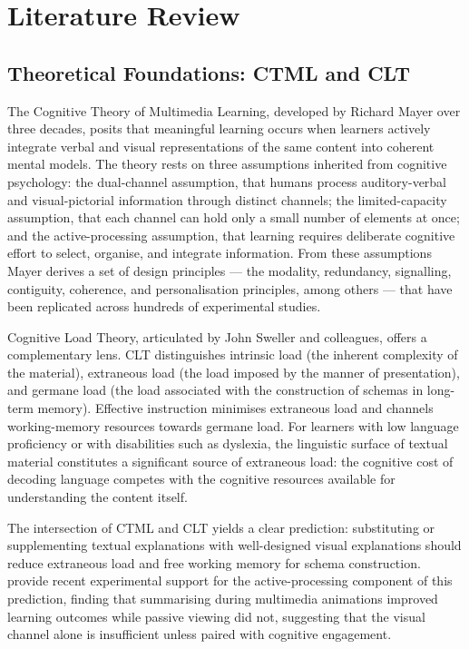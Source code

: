 %
%
\chapter{Literature Review}
\label{chap:litreview}
\setlength{\parskip}{1em}
%
\section{Theoretical Foundations: CTML and CLT}

The Cognitive Theory of Multimedia Learning, developed by Richard Mayer over three decades, posits that meaningful learning occurs when learners actively integrate verbal and visual representations of the same content into coherent mental models. The theory rests on three assumptions inherited from cognitive psychology: the dual-channel assumption, that humans process auditory-verbal and visual-pictorial information through distinct channels; the limited-capacity assumption, that each channel can hold only a small number of elements at once; and the active-processing assumption, that learning requires deliberate cognitive effort to select, organise, and integrate information. From these assumptions Mayer derives a set of design principles --- the modality, redundancy, signalling, contiguity, coherence, and personalisation principles, among others --- that have been replicated across hundreds of experimental studies.

Cognitive Load Theory, articulated by John Sweller and colleagues, offers a complementary lens. CLT distinguishes intrinsic load (the inherent complexity of the material), extraneous load (the load imposed by the manner of presentation), and germane load (the load associated with the construction of schemas in long-term memory). Effective instruction minimises extraneous load and channels working-memory resources towards germane load. For learners with low language proficiency or with disabilities such as dyslexia, the linguistic surface of textual material constitutes a significant source of extraneous load: the cognitive cost of decoding language competes with the cognitive resources available for understanding the content itself.

The intersection of CTML and CLT yields a clear prediction: substituting or supplementing textual explanations with well-designed visual explanations should reduce extraneous load and free working memory for schema construction. \citet{lawson2024} provide recent experimental support for the active-processing component of this prediction, finding that summarising during multimedia animations improved learning outcomes while passive viewing did not, suggesting that the visual channel alone is insufficient unless paired with cognitive engagement.

